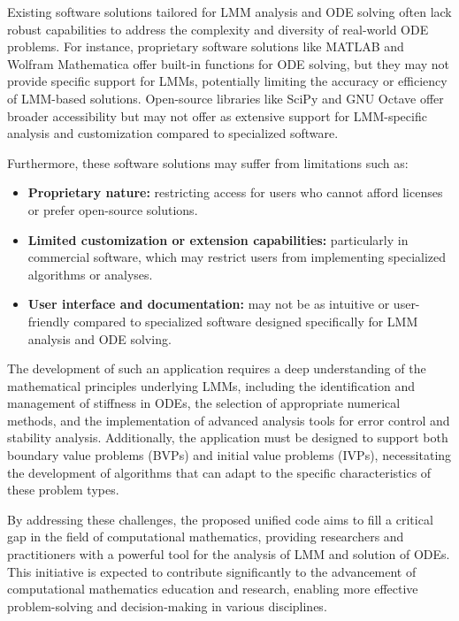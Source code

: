 Existing software solutions tailored for LMM analysis and ODE solving often lack robust capabilities to address the complexity and diversity of real-world ODE problems. For instance, proprietary software solutions like MATLAB and Wolfram Mathematica offer built-in functions for ODE solving, but they may not provide specific support for LMMs, potentially limiting the accuracy or efficiency of LMM-based solutions. Open-source libraries like SciPy and GNU Octave offer broader accessibility but may not offer as extensive support for LMM-specific analysis and customization compared to specialized software.

Furthermore, these software solutions may suffer from limitations such as:

\begin{itemize}
    \item \textbf{Proprietary nature:} restricting access for users who cannot afford licenses or prefer open-source solutions.
    \item \textbf{Limited customization or extension capabilities:} particularly in commercial software, which may restrict users from implementing specialized algorithms or analyses.
    \item \textbf{User interface and documentation:} may not be as intuitive or user-friendly compared to specialized software designed specifically for LMM analysis and ODE solving.
\end{itemize}

The development of such an application requires a deep understanding of the mathematical principles underlying LMMs, including the identification and management of stiffness in ODEs, the selection of appropriate numerical methods, and the implementation of advanced analysis tools for error control and stability analysis. Additionally, the application must be designed to support both boundary value problems (BVPs) and initial value problems (IVPs), necessitating the development of algorithms that can adapt to the specific characteristics of these problem types.

By addressing these challenges, the proposed unified code aims to fill a critical gap in the field of computational mathematics, providing researchers and practitioners with a powerful tool for the analysis of LMM and solution of ODEs. This initiative is expected to contribute significantly to the advancement of computational mathematics education and research, enabling more effective problem-solving and decision-making in various disciplines.

